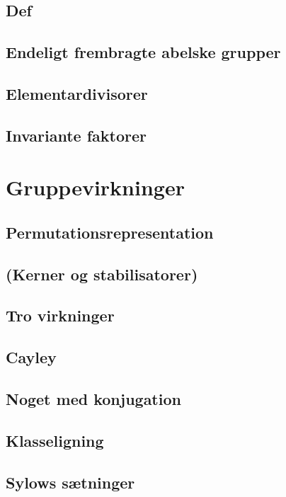 \documentclass[11pt]{article}
\begin{document}
\subsection*{Def}
\subsection*{Endeligt frembragte abelske grupper}
\subsection*{Elementardivisorer}
\subsection*{Invariante faktorer}

\section*{Gruppevirkninger}
\subsection*{Permutationsrepresentation}
\subsection*{(Kerner og stabilisatorer)}
\subsection*{Tro virkninger}
\subsection*{Cayley}
\subsection*{Noget med konjugation}
\subsection*{Klasseligning}
\subsection*{Sylows sætninger}
\end{document}

